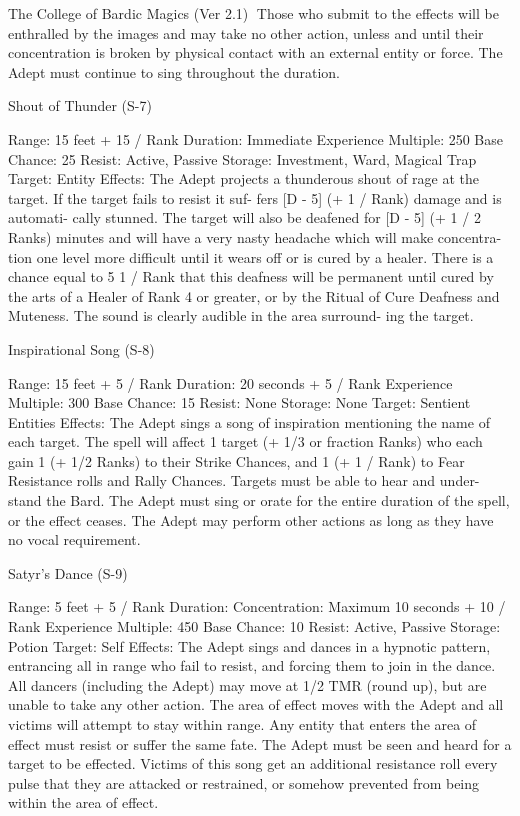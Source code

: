 \begin{Chapter}{The College of Bardic Magics (Ver 2.1)}
Those  who submit to the effects will be enthralled 
by the images and may take no other action, unless 
and until their concentration is broken by physical 
contact with an external entity or force. The Adept 
must continue to sing throughout the duration. 

Shout of Thunder (S-7) 

Range: 15 feet + 15 / Rank 
Duration: Immediate 
Experience Multiple: 250 
Base Chance: 25%
Resist: Active, Passive 
Storage: Investment, Ward, Magical Trap 
Target: Entity 
Effects:  The  Adept  projects  a  thunderous  shout  of 
rage at the target. If the target fails to resist it suf-
fers  [D  -  5]  (+  1 / Rank) damage  and  is automati-
cally stunned. The target will also be deafened for 
[D  -  5]  (+  1  /  2  Ranks)  minutes  and  will  have  a 
very  nasty  headache  which  will  make  concentra-
tion one level more difficult until it wears off or is 
cured by a healer. There is a chance equal to 5%
1 / Rank that this deafness will be permanent until 
cured by the arts of a Healer of Rank 4 or greater, 
or  by  the  Ritual  of  Cure  Deafness  and  Muteness. 
The  sound  is  clearly  audible  in  the  area  surround-
ing the target. 

Inspirational Song (S-8) 

Range: 15 feet + 5 / Rank 
Duration: 20 seconds + 5 / Rank 
Experience Multiple: 300 
Base Chance: 15%
Resist: None 
Storage: None 
Target: Sentient Entities 
Effects:  The  Adept  sings  a  song  of  inspiration 
mentioning the name of each target. The spell will 
affect  1  target  (+  1/3  or  fraction  Ranks)  who  each 
gain 1 (+ 1/2 Ranks) to their Strike Chances, and 1 
(+  1  /  Rank)  to  Fear  Resistance  rolls  and  Rally 
Chances.  Targets  must  be  able  to  hear  and  under-
stand  the  Bard.  The  Adept  must  sing  or  orate  for 
the entire duration of the spell, or the effect ceases. 
The  Adept  may  perform  other  actions  as  long  as 
they have no vocal requirement. 

Satyr’s Dance (S-9) 

Range: 5 feet + 5 / Rank 
Duration:  Concentration:  Maximum  10  seconds  + 
10 / Rank 
Experience Multiple: 450 
Base Chance: 10%
Resist: Active, Passive 
Storage: Potion 
Target: Self 
Effects: The  Adept sings and dances in a hypnotic 
pattern,  entrancing  all  in  range  who  fail  to  resist, 
and  forcing  them to  join  in the  dance.  All  dancers 
(including  the  Adept)  may  move  at  1/2  TMR 
(round up), but are unable to take any other action. 
The  area  of  effect  moves  with  the  Adept  and  all 
victims  will  attempt  to  stay  within  range.  Any 
entity  that  enters  the  area  of  effect  must  resist  or 
suffer  the  same  fate.  The  Adept  must  be  seen  and 
heard  for  a  target  to  be  effected.  Victims  of  this 
song  get  an  additional  resistance  roll  every  pulse 
that  they  are  attacked  or  restrained,  or  somehow 
prevented from being within the area of effect. 


\end{Chapter}
